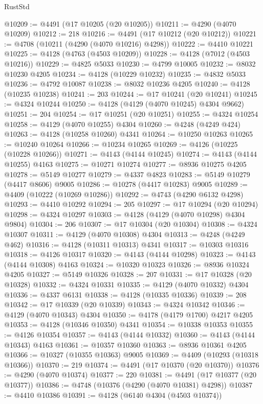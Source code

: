 \begin{lexlean}{RustStd}
\begin{coremodule}
@10209 := @4491 (@17 @10205 (@20 @10205))
@10211 := @4290 (@4070 @10209)
@10212 := 218
@10216 := @4491 (@17 @10212 (@20 @10212))
@10221 := @4708 (@10211 (@4290 (@4070 @10216) @4298))
@10222 := @4410 @10221
@10225 := @4128 (@4763 (@4503 @10209))
@10228 := @4128 (@7012 (@4503 @10216))
@10229 := @4825 @5033
@10230 := @4799 @10005
@10232 := @8032 @10230 @4205
@10234 := @4128 (@10229 @10232)
@10235 := @4832 @5033
@10236 := @4792 @10087
@10238 := @8032 @10236 @4205
@10240 := @4128 (@10235 @10238)
@10241 := 203
@10244 := @17 @10241 (@20 @10241)
@10245 := @4324 @10244
@10250 := @4128 (@4129 (@4070 @10245) @4304 @9662)
@10251 := 204
@10254 := @17 @10251 (@20 @10251)
@10255 := @4324 @10254
@10258 := @4129 (@4070 @10255) @4304
@10260 := @4248 (@4249 @424)
@10263 := @4128 (@10258 @10260) @4341
@10264 := @10250 @10263
@10265 := @10240 @10264
@10266 := @10234 @10265
@10269 := @4126 (@10225 (@10228 @10266))
@10271 := @4143 (@4144 @10245)
@10274 := @4143 (@4144 @10255) @4163
@10275 := @10271 @10274
@10277 := @8936 @10275 @4205
@10278 := @5149 @10277
@10279 := @4337 @4823
@10283 := @5149 @10279 (@4417 @8606) @9005
@10286 := @10278 (@4417 @10283) @9005
@10289 := @4409 (@10222 (@10269 @10286))
@10292 := @4743 (@4290 @6132 @4298)
@10293 := @4410 @10292
@10294 := 205
@10297 := @17 @10294 (@20 @10294)
@10298 := @4324 @10297
@10303 := @4128 (@4129 (@4070 @10298) @4304 @9804)
@10304 := 206
@10307 := @17 @10304 (@20 @10304)
@10308 := @4324 @10307
@10311 := @4129 (@4070 @10308) @4304
@10313 := @4248 (@4249 @462)
@10316 := @4128 (@10311 @10313) @4341
@10317 := @10303 @10316
@10318 := @4126 @10317
@10320 := @4143 (@4144 @10298)
@10323 := @4143 (@4144 @10308) @4163
@10324 := @10320 @10323
@10326 := @8936 @10324 @4205
@10327 := @5149 @10326
@10328 := 207
@10331 := @17 @10328 (@20 @10328)
@10332 := @4324 @10331
@10335 := @4129 (@4070 @10332) @4304
@10336 := @4337 @6131
@10338 := @4128 (@10335 @10336)
@10339 := 208
@10342 := @17 @10339 (@20 @10339)
@10343 := @4324 @10342
@10346 := @4129 (@4070 @10343) @4304
@10350 := @4178 (@4179 @1700) @4217 @4205
@10353 := @4128 (@10346 @10350) @4341
@10354 := @10338 @10353
@10355 := @4126 @10354
@10357 := @4143 (@4144 @10332)
@10360 := @4143 (@4144 @10343) @4163
@10361 := @10357 @10360
@10363 := @8936 @10361 @4205
@10366 := @10327 (@10355 @10363) @9005
@10369 := @4409 (@10293 (@10318 @10366))
@10370 := 219
@10374 := @4491 (@17 @10370 (@20 @10370))
@10376 := @4290 (@4070 @10374)
@10377 := 220
@10381 := @4491 (@17 @10377 (@20 @10377))
@10386 := @4748 (@10376 (@4290 (@4070 @10381) @4298))
@10387 := @4410 @10386
@10391 := @4128 (@6140 @4304 (@4503 @10374))

\end{coremodule}
\end{lexlean}

